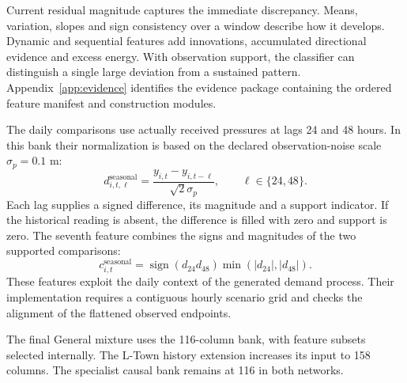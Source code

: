 Current residual magnitude captures the immediate discrepancy. Means, variation, slopes and sign consistency over a window describe how it develops. Dynamic and sequential features add innovations, accumulated directional evidence and excess energy. With observation support, the classifier can distinguish a single large deviation from a sustained pattern. Appendix~\ref{app:evidence} identifies the evidence package containing the ordered feature manifest and construction modules.

The daily comparisons use actually received pressures at lags 24 and 48 hours. In this bank their normalization is based on the declared observation-noise scale $\sigma_p=0.1$ m:
\begin{equation}
 d^{\mathrm{seasonal}}_{i,t,\ell}=
 \frac{y_{i,t}-y_{i,t-\ell}}{\sqrt{2}\sigma_p},
 \qquad \ell\in\{24,48\}.
\end{equation}
Each lag supplies a signed difference, its magnitude and a support indicator. If the historical reading is absent, the difference is filled with zero and support is zero. The seventh feature combines the signs and magnitudes of the two supported comparisons:
\begin{equation}
 c^{\mathrm{seasonal}}_{i,t}=\operatorname{sign}(d_{24}d_{48})
                   \min(|d_{24}|,|d_{48}|).
\end{equation}
These features exploit the daily context of the generated demand process. Their implementation requires a contiguous hourly scenario grid and checks the alignment of the flattened observed endpoints.

The final General mixture uses the 116-column bank, with feature subsets selected internally. The L-Town history extension increases its input to 158 columns. The specialist causal bank remains at 116 in both networks.

